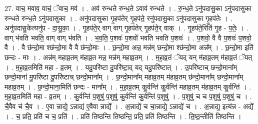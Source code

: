 \documentclass[17pt]{extarticle}
\begin{document}
27. वाच॒ मवाव॒ वाचं॒ ॅवाच॒ मव॑ । . अव॑ रुन्धते रुन्ध॒ते ऽवाव॑ रुन्धते । . रु॒न्ध॒ते ऽनु॑पदासु॒का ऽनु॑पदासुका रुन्धते रुन्ध॒ते ऽनु॑पदासुका । . अनु॑पदासुका गृ॒हप॑तेर् गृ॒हप॑ते॒ रनु॑पदासु॒का ऽनु॑पदासुका गृ॒हप॑तेः । . अनु॑पदासु॒केत्यनु॑प - दा॒सु॒का॒ । . गृ॒हप॑ते॒र् वाग् वाग् गृ॒हप॑तेर् गृ॒हप॑ते॒र् वाक् । . गृ॒हप॑ते॒रिति॑ गृ॒ह - प॒तेः॒ । . वाग् भ॑वति भवति॒ वाग् वाग् भ॑वति । . भ॒व॒ति॒ प॒शवः॑ प॒शवो॑ भवति भवति प॒शवः॑ । . प॒शवो॒ वै वै प॒शवः॑ प॒शवो॒ वै । . वै छ॑न्दो॒मा श्छ॑न्दो॒मा वै वै छ॑न्दो॒माः । . छ॒न्दो॒मा अन्न॒ मन्न॑म् छन्दो॒मा श्छ॑न्दो॒मा अन्न᳚म् । . छ॒न्दो॒मा इति॑ छन्दः - माः । . अन्न॑म् महाव्र॒तम् म॑हाव्र॒त मन्न॒ मन्न॑म् महाव्र॒तम् । . म॒हा॒व्र॒तं ॅयद् यन् म॑हाव्र॒तम् म॑हाव्र॒तं ॅयत् । . म॒हा॒व्र॒तमिति॑ महा - व्र॒तम् । . यदु॒परि॑ष्टा दु॒परि॑ष्टा॒द् यद् यदु॒परि॑ष्टात् । . उ॒परि॑ष्टाच् छन्दो॒माना᳚म् छन्दो॒माना॑ मु॒परि॑ष्टा दु॒परि॑ष्टाच् छन्दो॒माना᳚म् । . छ॒न्दो॒माना᳚म् महाव्र॒तम् म॑हाव्र॒तम् छ॑न्दो॒माना᳚म् छन्दो॒माना᳚म् महाव्र॒तम् । . छ॒न्दो॒माना॒मिति॑ छन्दः - माना᳚म् । . म॒हा॒व्र॒तम् कु॒र्वन्ति॑ कु॒र्वन्ति॑ महाव्र॒तम् म॑हाव्र॒तम् कु॒र्वन्ति॑ । . म॒हा॒व्र॒तमिति॑ महा - व्र॒तम् । . कु॒र्वन्ति॑ प॒शुषु॑ प॒शुषु॑ कु॒र्वन्ति॑ कु॒र्वन्ति॑ प॒शुषु॑ । . प॒शुषु॑ च च प॒शुषु॑ प॒शुषु॑ च । . चै॒वैव च॑ चै॒व । . ए॒वा न्नाद्ये॒ ऽन्नाद्य॑ ए॒वैवा न्नाद्ये᳚ । . अ॒न्नाद्ये॑ च चा॒न्नाद्ये॒ ऽन्नाद्ये॑ च । . अ॒न्नाद्य॒ इत्य॑न्न - अद्ये᳚ । . च॒ प्रति॒ प्रति॑ च च॒ प्रति॑ । . प्रति॑ तिष्ठन्ति तिष्ठन्ति॒ प्रति॒ प्रति॑ तिष्ठन्ति । . ति॒ष्ठ॒न्तीति॑ तिष्ठन्ति । \newline
\end{document}
